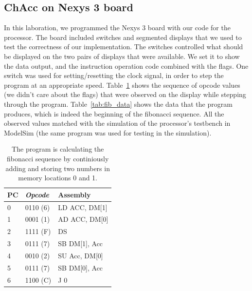 \documentclass[a4,11pt]{article}
\begin{document}
\subsection{ChAcc on Nexys 3 board}

In this laboration, we programmed the Nexys 3 board with our code for the processor. The board
included switches and segmented displays that we used to test the correctness of our implementation.
The switches controlled what should be displayed on the two pairs of displays that were available.
We set it to show the data output, and the instruction operation code combined with the flags.
One switch was used for setting/resetting the clock signal, in order to step the program at an
appropriate speed. Table~\ref{tab:fib} shows the sequence of opcode values (we didn't care about
the flags) that were observed on the display while stepping through the program.
Table~\ref{tab:fib_data} shows the data that the program produces, which is indeed the beginning
of the fibonacci sequence. All the observed values matched with the simulation of the processor's
testbench in ModelSim (the same program was used for testing in the simulation).

\newpage   

\begin{table}   
	\centering
	\small
	\def\arraystretch{1.1}              
	\begin{tabular}{|l|l|l|}
		\hline
		PC & {\it Opcode}    & {\bf Assembly} \\ \hline
		0  & 0110 (6)        & LD ACC, DM[1]  \\
    1  & 0001 (1)        & AD ACC, DM[0]  \\
    2  & 1111 (F)        & DS             \\
    3  & 0111 (7)        & SB DM[1], Acc  \\
    4  & 0010 (2)        & SU Acc, DM[0]  \\
    5  & 0111 (7)        & SB DM[0], Acc  \\
    6  & 1100 (C)        & J 0            \\ \hline
	\end{tabular}
	\caption{The program is calculating the fibonacci sequence by continiously adding and storing
           two numbers in memory locations 0 and 1.}
	\label{tab:fib}
\end{table}
\end{document}
